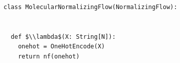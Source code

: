 \documentclass[border=10pt]{standalone}
\begin{document}
\begin{lstlisting}
class MolecularNormalizingFlow(NormalizingFlow):
  
  
  def $\\lambda$(X: String[N]):
    onehot = OneHotEncode(X)
    return nf(onehot)
\end{lstlisting}
\end{document}
